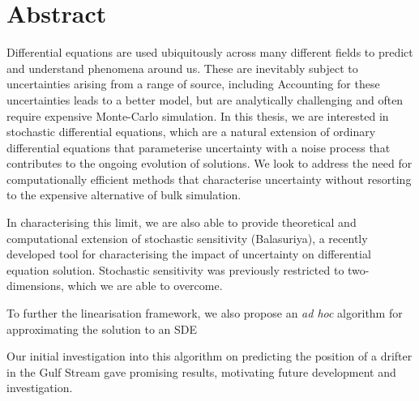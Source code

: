 \chapter{Abstract}
\label{ch:abstract}

Differential equations are used ubiquitously across many different fields to predict and understand phenomena around us.
These are inevitably subject to uncertainties arising from a range of source, including
Accounting for these uncertainties leads to a better model, but are analytically challenging and often require expensive Monte-Carlo simulation.
In this thesis, we are interested in stochastic differential equations, which are a natural extension of ordinary differential equations that parameterise uncertainty with a noise process that contributes to the ongoing evolution of solutions.
We look to address the need for computationally efficient methods that characterise uncertainty without resorting to the expensive alternative of bulk simulation.


In characterising this limit, we are also able to provide theoretical and computational extension of stochastic sensitivity (Balasuriya), a recently developed tool for characterising the impact of uncertainty on differential equation solution.
Stochastic sensitivity was previously restricted to two-dimensions, which we are able to overcome.

To further the linearisation framework, we also propose an \emph{ad hoc} algorithm for approximating the solution to an SDE

Our initial investigation into this algorithm on predicting the position of a drifter in the Gulf Stream gave promising results, motivating future development and investigation.
